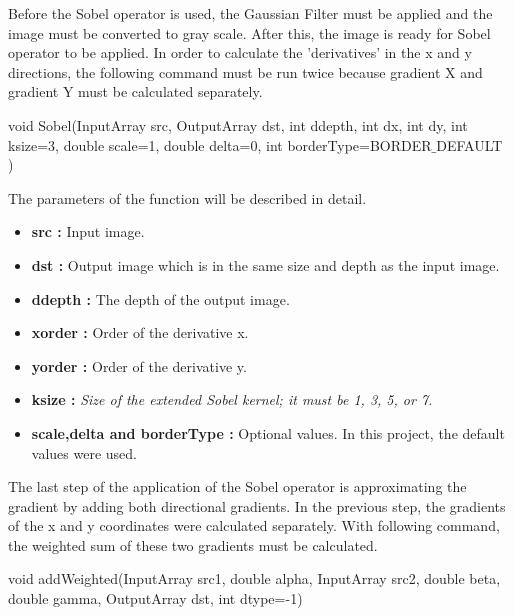 Before the Sobel operator is used, the Gaussian Filter must be applied and the image must be converted to gray scale. After this, the image is ready for Sobel operator to be applied. In order to calculate the 'derivatives' in the x and y directions, the following command must be run twice because gradient X and gradient Y must be calculated separately.

 \begin{center}

void Sobel(InputArray src, OutputArray dst, int ddepth, int dx, int dy, int ksize=3, double scale=1, double delta=0, int borderType=BORDER$\_$DEFAULT )

 \end{center}
 
 The parameters of the function will be described in detail.
 
  \begin{itemize}

\item \textbf{src : }Input image.

\item \textbf{dst : }Output image which is in the same size and depth as the input image.

\item \textbf{ddepth : }The depth of the output image.

\item \textbf{xorder : }Order of the derivative x.

\item \textbf{yorder : }Order of the derivative y.

\item \textbf{ksize : }\emph{\color{green}Size of the extended Sobel kernel; it must be 1, 3, 5, or 7.}

\item \textbf{scale,delta and borderType : }Optional values. In this project, the default values were used.

  \end{itemize}

The last step of the application of the Sobel operator is approximating the gradient by adding both directional gradients. In the previous step, the gradients of the x and y coordinates were calculated separately. With following command, the weighted sum of these two gradients must be calculated.\cite{addWeighted}

 \begin{center}
 
void addWeighted(InputArray src1, double alpha, InputArray src2, double beta, double gamma, OutputArray dst, int dtype=-1)
 
  \end{center}
  
